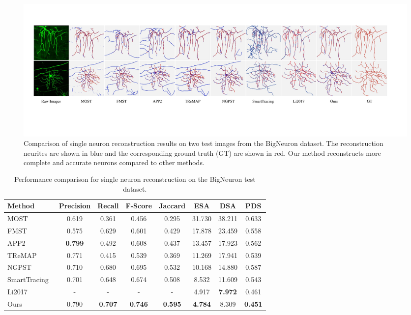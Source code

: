 \begin{figure}[th]
	\centering
	\includegraphics[width=1\textwidth]{./Illustrations/BigNeuron6.pdf}
	\caption{Comparison of single neuron reconstruction results on two test images from the BigNeuron dataset.
	The reconstruction neurites are shown in blue and the corresponding ground truth (GT) are shown in red.
	Our method reconstructs more complete and accurate neurons compared to other methods.
	}
	\label{fig:compare_BigNeuron}
\end{figure}

\begin{table}[th]
	\centering
	\makeatletter{}\makeatother
	\caption{Performance comparison for single neuron reconstruction on the BigNeuron test dataset.}
	\label{table:compare_BigNeuron}
	\begin{tabular}{lccccccc}
		\toprule
		Method & Precision & Recall & F-Score & Jaccard & ESA & DSA & PDS\\
		\midrule
		MOST~\cite{Wu2014} & 0.619 & 0.361 & 0.456 & 0.295 & 31.730 & 38.211 & 0.633\\
		FMST~\cite{Yang2019} & 0.575 & 0.629 & 0.601 & 0.429 & 17.878 & 23.459 & 0.558\\
		APP2~\cite{Xiao2013} & \textbf{0.799} & 0.492 & 0.608 & 0.437 & 13.457 & 17.923 & 0.562\\
		TReMAP~\cite{Zhou2016} & 0.771 & 0.415 & 0.539 & 0.369 & 11.269 & 17.941 & 0.539\\
		NGPST~\cite{Quan2015} & 0.710 & 0.680 & 0.695 & 0.532 & 10.168 & 14.880 & 0.587\\
		SmartTracing~\cite{Chen2015} & 0.701 & 0.648 & 0.674 & 0.508 & 8.532 & 11.609 & 0.543\\
		Li2017~\cite{Li2017} & - & - & - & - & 4.917 & \textbf{7.972} &0.461 \\
		\midrule
		Ours & 0.790 & \textbf{0.707} & \textbf{0.746}  & \textbf{0.595} & \textbf{4.784} & 8.309 & \textbf{0.451}\\
		\bottomrule
	\end{tabular}
\end{table}

